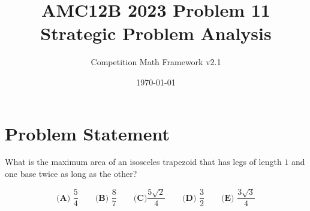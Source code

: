 \documentclass[12pt]{article}
\begin{document}
\title{AMC12B 2023 Problem 11\\Strategic Problem Analysis}
\author{Competition Math Framework v2.1}
\date{\today}
\maketitle

\section*{Problem Statement}

What is the maximum area of an isosceles trapezoid that has legs of length $1$ and one base twice as long as the other?

$$\textbf{(A) }\frac{5}{4} \qquad \textbf{(B) } \frac{8}{7} \qquad \textbf{(C)} \frac{5\sqrt{2}}{4} \qquad \textbf{(D) } \frac{3}{2} \qquad \textbf{(E) } \frac{3\sqrt{3}}{4}$$
\end{document}
